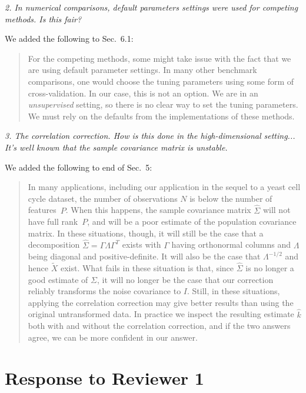 \documentclass[11pt]{article}
\newcommand{\T}{T}
\begin{document}
\emph{2. In numerical comparisons, default parameters settings were used for
competing methods. Is this fair?}

We added the following to Sec.~6.1:

\begin{quote}
For the competing methods, some might take issue with the fact that we are
using default parameter settings.  In many other benchmark comparisons, one
would choose the tuning parameters using some form of cross-validation. In our
case, this is not an option. We are in an \emph{unsupervised} setting, so
there is no clear way to set the tuning parameters. We must rely on the
defaults from the implementations of these methods.
\end{quote}


\emph{3. The correlation correction. How is this done in the high-dimensional
setting... It's well known that the sample covariance matrix is unstable.}

We added the following to end of Sec.~5:


\begin{quote}
In many applications, including our application in the sequel to a yeast cell
cycle dataset, the number of observations $N$ is below the number of
features~$P$. When this happens, the sample covariance matrix $\hat \Sigma$
will not have full rank~$P$, and will be a poor estimate of the population
covariance matrix. In these situations, though, it will still be the case that
a decomposition $\hat \Sigma = \Gamma \Lambda \Gamma^\T$ exists with $\Gamma$
having orthonormal columns and $\Lambda$ being diagonal and positive-definite.
It will also be the case that $\Lambda^{-1/2}$ and hence $\tilde{X}$
exist. What fails in these situation is that, since $\hat \Sigma$ is no longer
a good estimate of $\Sigma$, it will no longer be the case that our correction
reliably transforms the noise covariance to $I$. Still, in these situations,
applying the correlation correction may give better results than using the
original untransformed data. In practice we inspect the resulting estimate
$\hat k$ both with and without the correlation correction, and if the two
answers agree, we can be more confident in our answer.
\end{quote}


\newpage


\section{Response to Reviewer 1}
\end{document}
